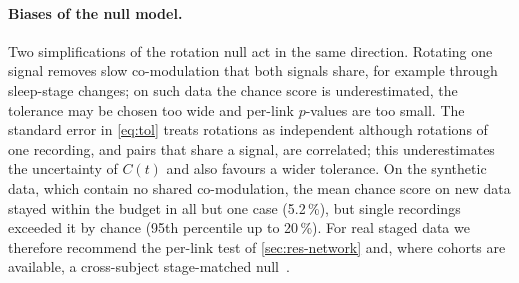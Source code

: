 \documentclass[11pt,a4paper]{article}
\begin{document}
\paragraph{Biases of the null model.} Two simplifications of the rotation null act in the same direction. Rotating one signal removes slow co-modulation that both signals share, for example through sleep-stage changes; on such data the chance score is underestimated, the tolerance may be chosen too wide and per-link $p$-values are too small. The standard error in \cref{eq:tol} treats rotations as independent although rotations of one recording, and pairs that share a signal, are correlated; this underestimates the uncertainty of $C(t)$ and also favours a wider tolerance. On the synthetic data, which contain no shared co-modulation, the mean chance score on new data stayed within the budget in all but one case (5.2\,\%), but single recordings exceeded it by chance (95th percentile up to 20\,\%). For real staged data we therefore recommend the per-link test of \cref{sec:res-network} and, where cohorts are available, a cross-subject stage-matched null~\cite{Bashan2012NetworkPhysiology}.
\end{document}
